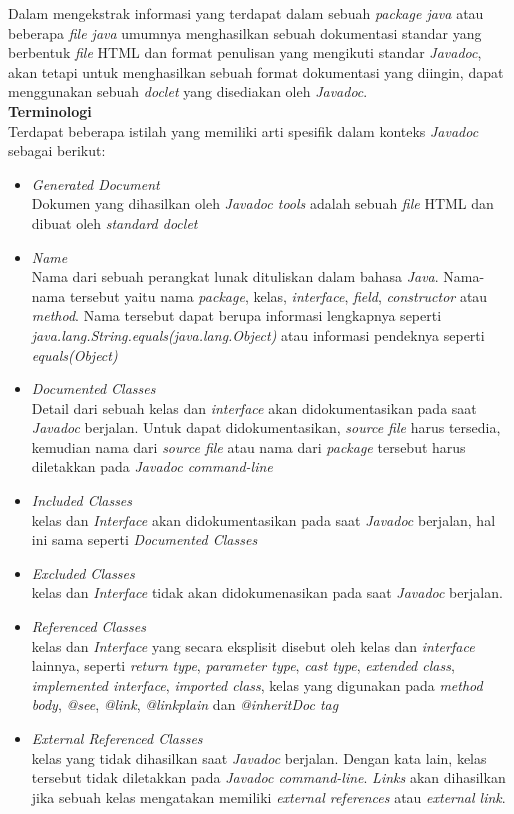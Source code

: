\documentclass[a4paper,twoside]{article}
\begin{document}
\begin{enumerate}
\begin{enumerate}
Dalam mengekstrak informasi yang terdapat dalam sebuah {\it package java} atau beberapa {\it file java} umumnya menghasilkan sebuah dokumentasi standar yang berbentuk {\it file} HTML dan format penulisan yang mengikuti standar {\it Javadoc}, akan tetapi untuk menghasilkan sebuah format dokumentasi yang diingin, dapat menggunakan sebuah {\it doclet} yang disediakan oleh {\it Javadoc}.\\

\textbf{Terminologi}\\
Terdapat beberapa istilah yang memiliki arti spesifik dalam konteks {\it Javadoc} sebagai berikut:
\begin{itemize}
	\item {\it Generated Document}\\
	Dokumen yang dihasilkan oleh {\it Javadoc tools} adalah sebuah {\it file} HTML dan dibuat oleh {\it standard doclet}
	\item {\it Name}\\
	Nama dari sebuah perangkat lunak dituliskan dalam bahasa {\it Java}. Nama-nama tersebut yaitu nama {\it package}, kelas, {\it interface}, {\it field}, {\it constructor} atau {\it method}. Nama tersebut dapat berupa informasi lengkapnya seperti {\it java.lang.String.equals(java.lang.Object)} atau informasi pendeknya seperti {\it equals(Object)}
	\item {\it Documented Classes}\\
	Detail dari sebuah kelas dan {\it interface} akan didokumentasikan pada saat {\it Javadoc} berjalan. Untuk dapat didokumentasikan, {\it source file} harus tersedia, kemudian nama dari {\it source file} atau nama dari {\it package} tersebut harus diletakkan pada {\it Javadoc command-line}
	\item {\it Included Classes}\\
	kelas dan {\it Interface} akan didokumentasikan pada saat {\it Javadoc} berjalan, hal ini sama seperti {\it Documented Classes}
	\item {\it Excluded Classes}\\
	kelas dan {\it Interface} tidak akan didokumenasikan pada saat {\it Javadoc} berjalan.
	\item {\it Referenced Classes}\\
	kelas dan {\it Interface} yang secara eksplisit disebut oleh kelas dan {\it interface} lainnya, seperti {\it return type}, {\it parameter type}, {\it cast type}, {\it extended class}, {\it implemented interface}, {\it imported class}, kelas yang digunakan pada {\it method body}, {\it @see}, {\it {@link}}, {\it {@linkplain}} dan {\it {@inheritDoc} tag} 
	\item {\it External Referenced Classes}\\
	kelas yang tidak dihasilkan saat {\it Javadoc} berjalan. Dengan kata lain, kelas tersebut tidak diletakkan pada {\it Javadoc command-line}. {\it Links} akan dihasilkan jika sebuah kelas mengatakan memiliki {\it external references} atau {\it external link}.
\end{itemize}


\end{enumerate}
\end{enumerate}
\end{document}
